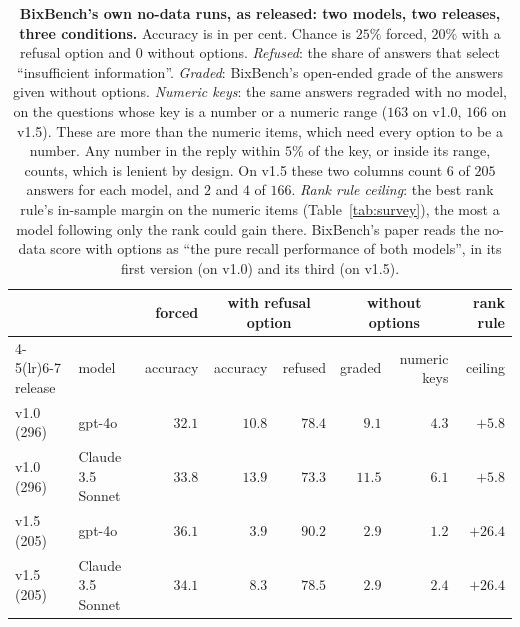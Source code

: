 \documentclass{article}
\begin{document}
\begin{table}[htbp]
\centering\footnotesize\setlength{\tabcolsep}{4pt}
\caption{\textbf{BixBench's own no-data runs, as released: two models, two releases, three conditions.} Accuracy is
in per cent. Chance is $25\%$ forced, $20\%$ with a refusal option and $0$ without options. \emph{Refused}: the share
of answers that select ``insufficient information''. \emph{Graded}: BixBench's open-ended grade of the answers given
without options. \emph{Numeric keys}: the same answers regraded with no model, on the questions whose key is a number
or a numeric range ($163$ on v1.0, $166$ on v1.5). These are more than the numeric items, which need every option to
be a number. Any number in the reply within $5\%$ of the key, or inside its range, counts, which is lenient by design.
On v1.5 these two columns count $6$ of $205$ answers for each model, and $2$ and $4$ of $166$. \emph{Rank rule
ceiling}: the best rank rule's in-sample margin on the numeric items (Table~\ref{tab:survey}), the most a model
following only the rank could gain there. BixBench's paper reads the no-data score with options as ``the pure recall performance of both models'',
in its first version (on v1.0) and its third (on v1.5).}
\label{tab:arms}
\begin{tabular}{llrrrrrr}
\toprule
& & forced & \multicolumn{2}{c}{with refusal option} & \multicolumn{2}{c}{without options} & rank rule\\
\cmidrule(lr){4-5}\cmidrule(lr){6-7}
release & model & accuracy & accuracy & refused & graded & numeric keys & ceiling\\
\midrule
v1.0 (296) & gpt-4o & $32.1$ & $10.8$ & $78.4$ & $9.1$ & $4.3$ & $+5.8$\\
v1.0 (296) & Claude 3.5 Sonnet & $33.8$ & $13.9$ & $73.3$ & $11.5$ & $6.1$ & $+5.8$\\
v1.5 (205) & gpt-4o & $36.1$ & $3.9$ & $90.2$ & $2.9$ & $1.2$ & $+26.4$\\
v1.5 (205) & Claude 3.5 Sonnet & $34.1$ & $8.3$ & $78.5$ & $2.9$ & $2.4$ & $+26.4$\\
\bottomrule
\end{tabular}
\end{table}
\end{document}
